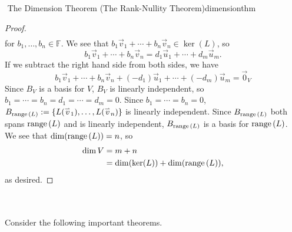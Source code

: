 \begin{theorem}{\Stop\,\,The Dimension Theorem (The Rank-Nullity Theorem)}{dimensionthm}
\begin{proof}
\begin{align*}
                \end{align*}
                for \(b_1,\ldots,b_n\in\mathbb{F}\). We see that \(b_1\vec{v}_1+\cdots+b_n\vec{v}_n\in\ker(L)\), so
                \begin{equation*}
                    b_1\vec{v}_1+\cdots+b_n\vec{v}_n=d_1\vec{u}_1+\cdots+d_m\vec{u}_m.
                \end{equation*}
                If we subtract the right hand side from both sides, we have
                \begin{equation*}
                    b_1\vec{v}_1+\cdots+b_n\vec{v}_n+(-d_1)\vec{u}_1+\cdots+(-d_m)\vec{u}_m=\vec{0}_V
                \end{equation*}
                Since \(B_V\) is a basis for \(V\), \(B_V\) is linearly independent, so \(b_1=\cdots=b_n=d_1=\cdots=d_m=0\). Since \(b_1=\cdots=b_n=0\), \(B_{\text{range\,}(L)}:=\{L(\overset{_{\rightharpoonup}}{v}_1),\ldots,L(\overset{_{\rightharpoonup}}{v}_n)\}\) is linearly independent. Since \(B_{\text{range\,}(L)}\) both spans \(\text{range\,}(L)\) and is linearly independent, \(B_{\text{range\,}(L)}\) is a basis for \(\text{range\,}(L)\). We see that \(\dim(\text{range\,}(L))=n\), so
                \begin{align*}
                    \dim V&=m+n \\
                    &=\dim(\ker(L))+\dim(\text{range\,}(L)),
                \end{align*}
                as desired.
            \end{proof}

        \end{theorem}
        \vphantom
        \\
        \\
        Consider the following important theorems.
